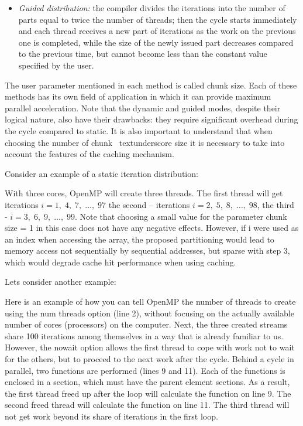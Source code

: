 {\begin{itemize}
		\item\textit{Guided distribution:} the compiler divides the iterations into the number of parts equal to twice the number of threads; then the cycle starts immediately and each thread receives a new part of iterations as the work on the previous one is completed, while the size of the newly issued part decreases compared to the previous time, but cannot become less than the constant value specified by the user.
	\end{itemize}
	\par The user parameter mentioned in each method is called chunk \textunderscore size. Each of these methods has its own field of application in which it can provide maximum parallel acceleration. Note that the dynamic and guided modes, despite their logical nature, also have their drawbacks: they require significant overhead during the cycle compared to static. It is also important to understand that when choosing the number of chunk \ textunderscore size it is necessary to take into account the features of the caching mechanism.
	\par Consider an example of a static iteration distribution:
	\begin{figure}[H]
		
	\end{figure}
	\par With three cores, OpenMP will create three threads. The first thread will get iterations $i=1,\;4,\;7,\;…,\;97$ the second – iterations $i=2,\;5,\;8,\;…,\;98$, the third -  $i=3,\;6,\;9,\;…,\;99$. Note that choosing a small value for the parameter chunk \textunderscore size = 1 in this case does not have any negative effects. However, if i were used as an index when accessing the array, the proposed partitioning would lead to memory access not sequentially by sequential addresses, but sparse with step 3, which would degrade cache hit performance when using caching.
	\par Lets consider another example: 
	\begin{figure}[H]
		
	\end{figure}
	\par Here is an example of how you can tell OpenMP the number of threads to create using the num \textunderscore threads option (line 2), without focusing on the actually available number of cores (processors) on the computer. Next, the three created streams share 100 iterations among themselves in a way that is already familiar to us. However, the nowait option allows the first thread to cope with work not to wait for the others, but to proceed to the next work after the cycle. Behind a cycle in parallel, two functions are performed (lines 9 and 11). Each of the functions is enclosed in a section, which must have the parent element sections. As a result, the first thread freed up after the loop will calculate the function on line 9. The second freed thread will calculate the function on line 11. The third thread will not get work beyond its share of iterations in the first loop.
}
